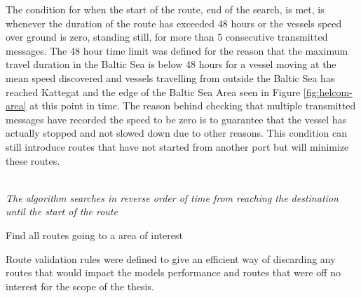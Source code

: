 \documentclass[../main.tex]{subfiles}
\begin{document}
The condition for when the start of the route, end of the search, is met, is whenever the duration of the route has exceeded 48 hours or the vessels speed over ground is zero, standing still, for more than 5 consecutive transmitted messages. The 48 hour time limit was defined for the reason that the maximum travel duration in the Baltic Sea is below 48 hours for a vessel moving at the mean speed discovered and vessels travelling from outside the Baltic Sea has reached Kattegat and the edge of the Baltic Sea Area seen in Figure \ref{fig:helcom-area} at this point in time. The reason behind checking that multiple transmitted messages have recorded the speed to be zero is to guarantee that the vessel has actually stopped and not slowed down due to other reasons. This condition can still introduce routes that have not started from another port but will minimize these routes.
\\\\
\begin{algorithm}[H]
\SetAlgoNoLine
\SetAlgoNoEnd

\emph{The algorithm searches in reverse order of time from reaching the destination until the start of the route}\;
\BlankLine
{}
\caption{Find all routes going to a area of interest}
\label{alg:search}
\end{algorithm}
\vspace*{5mm}

Route validation rules were defined to give an efficient way of discarding any routes that would impact the models performance and routes that were off no interest for the scope of the thesis.
\end{document}
